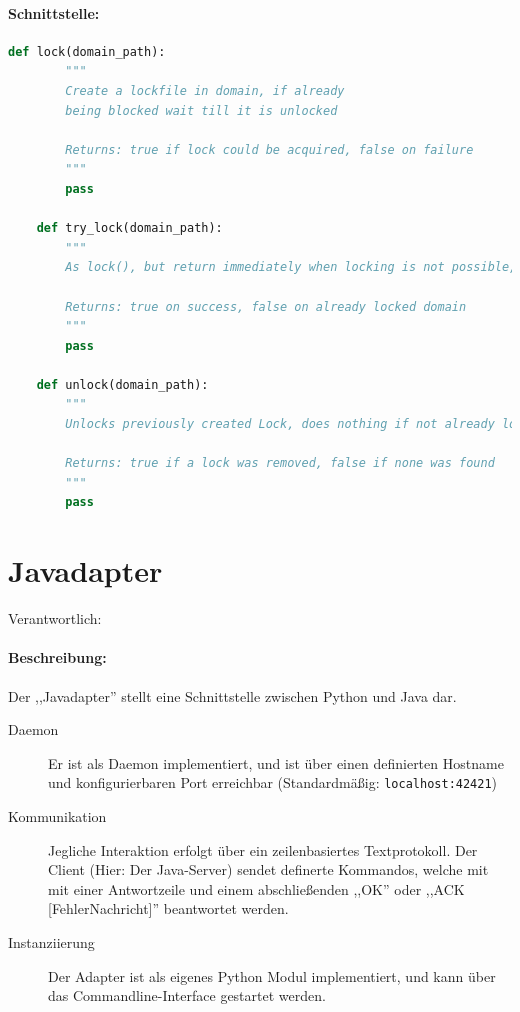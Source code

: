 \paragraph{Schnittstelle:}
\label{par:schnittstelle_}
\hfill
\begin{lstlisting}[language=python]
    def lock(domain_path):
        """
        Create a lockfile in domain, if already
        being blocked wait till it is unlocked

        Returns: true if lock could be acquired, false on failure
        """
        pass

    def try_lock(domain_path):
        """
        As lock(), but return immediately when locking is not possible,

        Returns: true on success, false on already locked domain
        """
        pass

    def unlock(domain_path):
        """
        Unlocks previously created Lock, does nothing if not already locked.

        Returns: true if a lock was removed, false if none was found
        """
        pass
\end{lstlisting}



\section{Javadapter} 
\label{sec:javadapter}
Verantwortlich: \ciii 
\paragraph{Beschreibung:}
\label{par:beschreibung_}
Der ,,Javadapter'' stellt eine Schnittstelle zwischen Python und Java dar.
\begin{description}
  \item [Daemon] Er ist als Daemon implementiert, und ist über einen
    definierten Hostname und konfigurierbaren Port erreichbar 
    (Standardmäßig: \texttt{localhost:42421})
  \item [Kommunikation] Jegliche Interaktion erfolgt über ein
    zeilenbasiertes Textprotokoll. Der Client (Hier: Der Java-Server)
    sendet definerte Kommandos, welche mit mit einer Antwortzeile
    und einem abschließenden ,,OK'' oder ,,ACK [FehlerNachricht]''
    beantwortet werden.
  \item [Instanziierung] Der Adapter ist als eigenes Python Modul
    implementiert, und kann über das Commandline-Interface gestartet
    werden.
\end{description}
 
